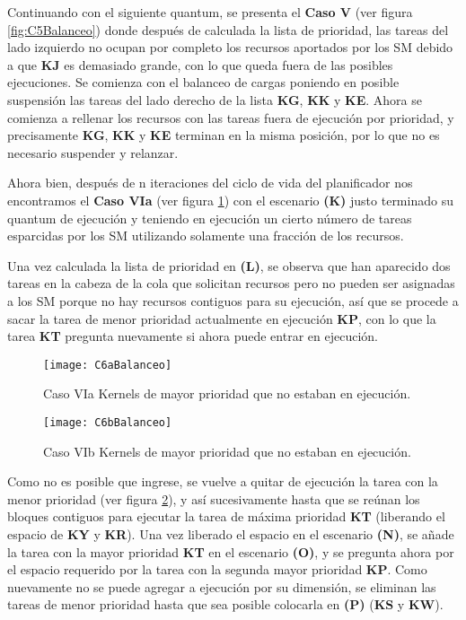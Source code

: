     Continuando con el siguiente quantum, se presenta el \textbf{Caso V} (ver figura \ref{fig:C5Balanceo}) donde después de calculada la lista de prioridad, las tareas del lado izquierdo no ocupan por completo los recursos aportados por los SM debido a que \textbf{KJ} es demasiado grande, con lo que queda fuera de las posibles ejecuciones.
    Se comienza con el balanceo de cargas poniendo en posible suspensión las tareas del lado derecho de la lista \textbf{KG}, \textbf{KK} y \textbf{KE}. Ahora se comienza a rellenar los recursos con las tareas fuera de ejecución por prioridad, y precisamente \textbf{KG}, \textbf{KK} y \textbf{KE} terminan en la misma posición, por lo que no es necesario suspender y relanzar.
\newline

   Ahora bien, después de n iteraciones del ciclo de vida del planificador nos encontramos el \textbf{Caso VIa} (ver figura \ref{fig:C6aBalanceo}) con el escenario \textbf{(K)} justo terminado su quantum de ejecución y teniendo en ejecución un cierto número de tareas esparcidas por los SM utilizando solamente una fracción de los recursos. 
   \newline
   
   Una vez calculada la lista de prioridad en \textbf{(L)}, se observa que han aparecido dos tareas en la cabeza de la cola que solicitan recursos pero no pueden ser asignadas a los SM porque no hay recursos contiguos para su ejecución, así que se procede a sacar la tarea de menor prioridad actualmente en ejecución \textbf{KP}, con lo que la tarea \textbf{KT} pregunta nuevamente si ahora puede entrar en ejecución.

    \begin{figure}[!]
      \centering
        \texttt{[image: C6aBalanceo]}
        \caption{Caso VIa Kernels de mayor prioridad que no estaban en ejecución.}
        \label{fig:C6aBalanceo}
    \end{figure}
    
    \begin{figure}[!]
      \centering
        \texttt{[image: C6bBalanceo]}
        \caption{Caso VIb Kernels de mayor prioridad que no estaban en ejecución.}
        \label{fig:C6bBalanceo}
    \end{figure}

 Como no es posible que ingrese, se vuelve a quitar de ejecución la tarea con la menor prioridad (ver figura  \ref{fig:C6bBalanceo}), y así sucesivamente hasta que se reúnan los bloques contiguos para ejecutar la tarea de máxima prioridad \textbf{KT} (liberando el espacio de \textbf{KY} y \textbf{KR}). Una vez liberado el espacio en el escenario \textbf{(N)}, se añade la tarea con la mayor prioridad \textbf{KT} en el escenario \textbf{(O)}, y se pregunta ahora por el espacio requerido por la tarea con la segunda mayor prioridad \textbf{KP}. Como nuevamente no se puede agregar a ejecución por su dimensión, se eliminan las tareas de menor prioridad hasta que sea posible colocarla en \textbf{(P)} (\textbf{KS} y \textbf{KW}).
\newline

